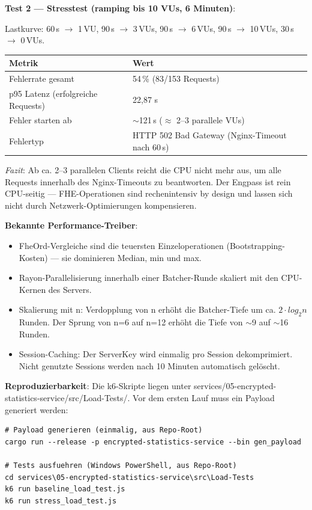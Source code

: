 \textbf{Test 2 — Stresstest (ramping bis 10 VUs, 6 Minuten)}:\par
Lastkurve: 60\,s $\rightarrow$ 1\,VU, 90\,s $\rightarrow$ 3\,VUs, 90\,s $\rightarrow$ 6\,VUs, 90\,s $\rightarrow$ 10\,VUs, 30\,s $\rightarrow$ 0\,VUs.\par
\begin{tabular}{||l|l||}
    \hline
    \textbf{Metrik} & \textbf{Wert} \\
    \hline\hline
    Fehlerrate gesamt & 54\,\% (83/153 Requests) \\
    \hline
    p95 Latenz (erfolgreiche Requests) & 22,87 s \\
    \hline
    Fehler starten ab & $\sim$121\,s ($\approx$ 2–3 parallele VUs) \\
    \hline
    Fehlertyp & HTTP 502 Bad Gateway (Nginx-Timeout nach 60\,s) \\
    \hline
\end{tabular}\par
\textit{Fazit}: Ab ca. 2–3 parallelen Clients reicht die CPU nicht mehr aus, um alle Requests innerhalb des Nginx-Timeouts zu beantworten. Der Engpass ist rein CPU-seitig — FHE-Operationen sind rechenintensiv by design und lassen sich nicht durch Netzwerk-Optimierungen kompensieren.\par

\textbf{Bekannte Performance-Treiber}:
\begin{itemize}
    \item FheOrd-Vergleiche sind die teuersten Einzeloperationen (Bootstrapping-Kosten) — sie dominieren Median, min und max.
    \item Rayon-Parallelisierung innerhalb einer Batcher-Runde skaliert mit den CPU-Kernen des Servers.
    \item Skalierung mit n: Verdopplung von n erhöht die Batcher-Tiefe um ca. $2 \cdot log_2n$ Runden. Der Sprung von n=6 auf n=12 erhöht die Tiefe von $\sim$9 auf $\sim$16 Runden.
    \item Session-Caching: Der ServerKey wird einmalig pro Session dekomprimiert. Nicht genutzte Sessions werden nach 10 Minuten automatisch gelöscht.
\end{itemize}

\textbf{Reproduzierbarkeit}:
Die k6-Skripte liegen unter services/05-encrypted-statistics-service/src/Load-Tests/. Vor dem ersten Lauf muss ein Payload generiert werden:
\begin{lstlisting}
# Payload generieren (einmalig, aus Repo-Root)
cargo run --release -p encrypted-statistics-service --bin gen_payload

# Tests ausfuehren (Windows PowerShell, aus Repo-Root)
cd services\05-encrypted-statistics-service\src\Load-Tests
k6 run baseline_load_test.js
k6 run stress_load_test.js
\end{lstlisting}

